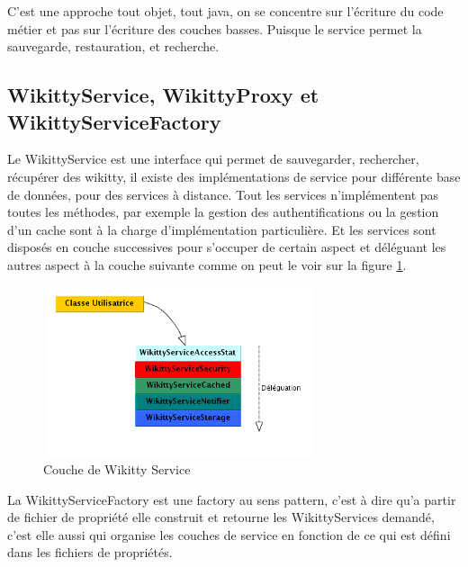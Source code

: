 C'est une approche tout objet, tout java, on se concentre sur l'écriture du code
métier et pas sur l'écriture des couches basses. Puisque le service permet la
sauvegarde, restauration, et recherche.

% 
% 


\subsection{WikittyService, WikittyProxy et WikittyServiceFactory}

Le WikittyService est une interface qui permet de sauvegarder, rechercher,
récupérer des wikitty, il existe des implémentations de service pour différente
base de données, pour des services à distance. Tout les services n'implémentent 
pas toutes les méthodes, par exemple la gestion des authentifications ou la 
gestion d'un cache sont à la charge d'implémentation particulière. Et les
services sont disposés en couche successives pour s'occuper de certain aspect
et déléguant les autres aspect à la couche suivante comme on peut le voir sur 
la figure \ref{pileService}.

\begin{figure}[!ht]
\centering
\includegraphics[height=5cm,width=8cm]{image/pileService.png}
  		\caption{Couche de Wikitty Service}
  		\label{pileService}
\end{figure}

La WikittyServiceFactory est une factory au sens pattern, c'est à dire qu'a 
partir de fichier de propriété elle construit et retourne les WikittyServices 
demandé, c'est elle aussi qui organise les couches de service en fonction de ce 
qui est défini dans les fichiers de propriétés.

